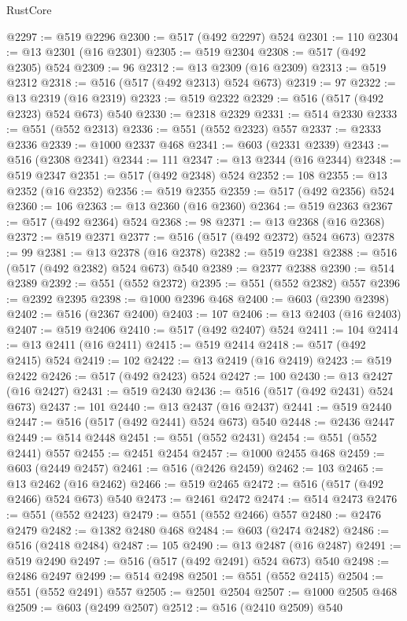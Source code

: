 \begin{lexlean}{RustCore}
\begin{coremodule}
@2297 := @519 @2296
@2300 := @517 (@492 @2297) @524
@2301 := 110
@2304 := @13 @2301 (@16 @2301)
@2305 := @519 @2304
@2308 := @517 (@492 @2305) @524
@2309 := 96
@2312 := @13 @2309 (@16 @2309)
@2313 := @519 @2312
@2318 := @516 (@517 (@492 @2313) @524 @673)
@2319 := 97
@2322 := @13 @2319 (@16 @2319)
@2323 := @519 @2322
@2329 := @516 (@517 (@492 @2323) @524 @673) @540
@2330 := @2318 @2329
@2331 := @514 @2330
@2333 := @551 (@552 @2313)
@2336 := @551 (@552 @2323) @557
@2337 := @2333 @2336
@2339 := @1000 @2337 @468
@2341 := @603 (@2331 @2339)
@2343 := @516 (@2308 @2341)
@2344 := 111
@2347 := @13 @2344 (@16 @2344)
@2348 := @519 @2347
@2351 := @517 (@492 @2348) @524
@2352 := 108
@2355 := @13 @2352 (@16 @2352)
@2356 := @519 @2355
@2359 := @517 (@492 @2356) @524
@2360 := 106
@2363 := @13 @2360 (@16 @2360)
@2364 := @519 @2363
@2367 := @517 (@492 @2364) @524
@2368 := 98
@2371 := @13 @2368 (@16 @2368)
@2372 := @519 @2371
@2377 := @516 (@517 (@492 @2372) @524 @673)
@2378 := 99
@2381 := @13 @2378 (@16 @2378)
@2382 := @519 @2381
@2388 := @516 (@517 (@492 @2382) @524 @673) @540
@2389 := @2377 @2388
@2390 := @514 @2389
@2392 := @551 (@552 @2372)
@2395 := @551 (@552 @2382) @557
@2396 := @2392 @2395
@2398 := @1000 @2396 @468
@2400 := @603 (@2390 @2398)
@2402 := @516 (@2367 @2400)
@2403 := 107
@2406 := @13 @2403 (@16 @2403)
@2407 := @519 @2406
@2410 := @517 (@492 @2407) @524
@2411 := 104
@2414 := @13 @2411 (@16 @2411)
@2415 := @519 @2414
@2418 := @517 (@492 @2415) @524
@2419 := 102
@2422 := @13 @2419 (@16 @2419)
@2423 := @519 @2422
@2426 := @517 (@492 @2423) @524
@2427 := 100
@2430 := @13 @2427 (@16 @2427)
@2431 := @519 @2430
@2436 := @516 (@517 (@492 @2431) @524 @673)
@2437 := 101
@2440 := @13 @2437 (@16 @2437)
@2441 := @519 @2440
@2447 := @516 (@517 (@492 @2441) @524 @673) @540
@2448 := @2436 @2447
@2449 := @514 @2448
@2451 := @551 (@552 @2431)
@2454 := @551 (@552 @2441) @557
@2455 := @2451 @2454
@2457 := @1000 @2455 @468
@2459 := @603 (@2449 @2457)
@2461 := @516 (@2426 @2459)
@2462 := 103
@2465 := @13 @2462 (@16 @2462)
@2466 := @519 @2465
@2472 := @516 (@517 (@492 @2466) @524 @673) @540
@2473 := @2461 @2472
@2474 := @514 @2473
@2476 := @551 (@552 @2423)
@2479 := @551 (@552 @2466) @557
@2480 := @2476 @2479
@2482 := @1382 @2480 @468
@2484 := @603 (@2474 @2482)
@2486 := @516 (@2418 @2484)
@2487 := 105
@2490 := @13 @2487 (@16 @2487)
@2491 := @519 @2490
@2497 := @516 (@517 (@492 @2491) @524 @673) @540
@2498 := @2486 @2497
@2499 := @514 @2498
@2501 := @551 (@552 @2415)
@2504 := @551 (@552 @2491) @557
@2505 := @2501 @2504
@2507 := @1000 @2505 @468
@2509 := @603 (@2499 @2507)
@2512 := @516 (@2410 @2509) @540

\end{coremodule}
\end{lexlean}
